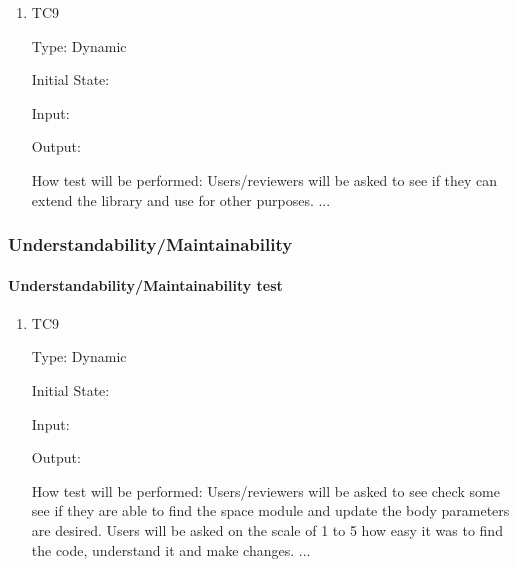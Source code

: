 \documentclass[12pt, titlepage]{article}
\begin{document}
\begin{enumerate}
	
\item{TC9\\}

Type: Dynamic

Initial State: 

Input: 

Output: 

How test will be performed: Users/reviewers will be asked to see if they can extend the library and use for other purposes.
...
\end{enumerate}

\subsubsection{Understandability/Maintainability}

\paragraph{Understandability/Maintainability test}

\begin{enumerate}
	
	\item{TC9\\}
	
	Type: Dynamic
	
	Initial State: 
	
	Input: 
	
	Output: 
	
	How test will be performed: Users/reviewers will be asked to see check some see if they are able to find the space module and update the body parameters are desired. Users will be asked on the scale of 1 to 5 how easy it was to find the code, understand it and make changes.
	...
\end{enumerate}
\end{document}
